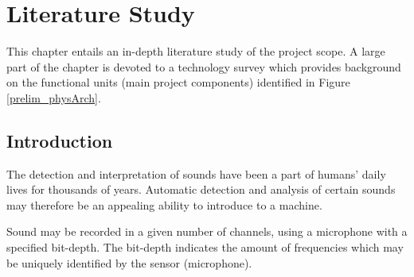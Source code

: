 \documentclass[a4paper,12pt]{article}
\numberwithin{equation}{section}
\numberwithin{figure}{section}
\numberwithin{table}{section}
\begin{document}
\newpage
\section{Literature Study}

This chapter entails an in-depth literature study of the project scope. A large part of the chapter is devoted to a technology survey which provides background on the functional units (main project components) identified in Figure \ref{prelim_physArch}.

\subsection{Introduction}

The detection and interpretation of sounds have been a part of humans' daily lives for thousands of years. Automatic detection and analysis of certain sounds may therefore be an appealing ability to introduce to a machine.







Sound may be recorded in a given number of channels, using a microphone with a specified bit-depth. The bit-depth indicates the amount of frequencies which may be uniquely identified by the sensor (microphone).



\end{document}
